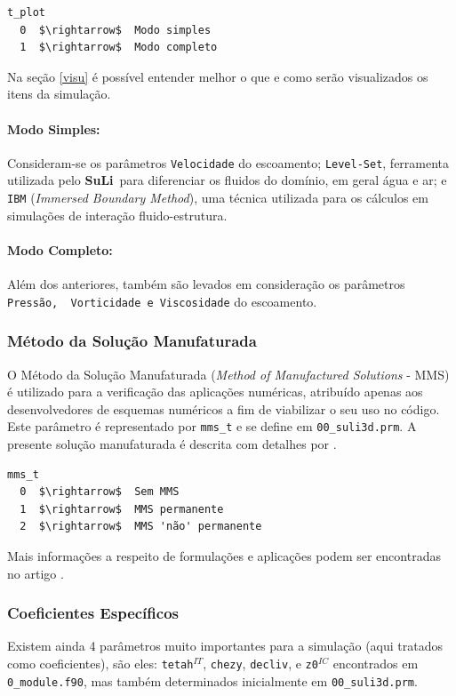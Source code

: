 \documentclass[12pt, a4paper]{article}
\newcommand{\SL}{{\bf SuLi}}
\begin{document}
\begin{lstlisting}
t_plot	
  0  $\rightarrow$  Modo simples
  1  $\rightarrow$  Modo completo
\end{lstlisting}

Na seção \ref{visu} é possível entender melhor o que e como serão visualizados os itens da simulação.

\paragraph{Modo Simples:} Consideram-se os parâmetros \verb|Velocidade| do escoamento; \verb|Level-Set|, ferramenta utilizada pelo \SL\ para diferenciar os fluidos do domínio, em geral água e ar; e \verb|IBM| (\textit{Immersed Boundary Method}), uma técnica utilizada para os cálculos em simulações de interação fluido-estrutura.
\paragraph{Modo Completo:} Além dos anteriores, também são levados em consideração os parâmetros \verb|Pressão,  Vorticidade e Viscosidade| do escoamento.

\subsubsection{Método da Solução Manufaturada}
O Método da Solução Manufaturada (\textit{Method of Manufactured Solutions} - MMS) é utilizado para a verificação das aplicações numéricas, atribuído apenas aos desenvolvedores de esquemas numéricos a fim de viabilizar o seu uso no código. Este parâmetro é representado por \verb|mms_t| e se define em \verb|00_suli3d.prm|. A presente solução manufaturada é descrita com detalhes por \cite{wang2009}.

\begin{lstlisting}[escapeinside='']
mms_t	
  0  $\rightarrow$  Sem MMS
  1  $\rightarrow$  MMS permanente
  2  $\rightarrow$  MMS 'não' permanente
\end{lstlisting}


Mais informações a respeito de formulações e aplicações podem ser encontradas no artigo \cite{monteiro2019}.

\subsubsection{Coeficientes Específicos}
Existem ainda 4 parâmetros muito importantes para a simulação (aqui tratados como coeficientes), são eles: \verb|tetah|$^{IT}$,  \verb|chezy|, \verb|decliv|, e \verb|z0|$^{IC}$ encontrados em \verb|0_module.f90|, mas também determinados inicialmente em \verb|00_suli3d.prm|.
\end{document}
